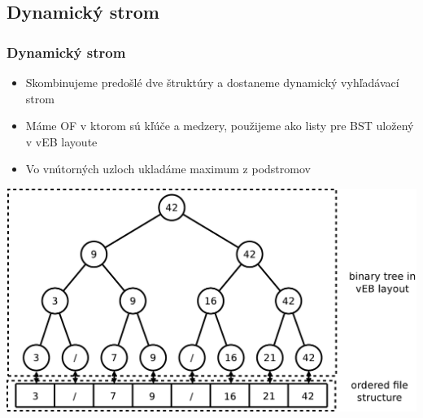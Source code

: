 \documentclass{beamer}
\begin{document}
\subsection{Dynamický strom}
\begin{frame}
    \frametitle{Dynamický strom}
    \begin{itemize}
        \item Skombinujeme predošlé dve štruktúry a dostaneme dynamický vyhľadávací strom
        \item Máme OF v ktorom sú kľúče a medzery, použijeme ako listy pre BST uložený v vEB layoute
        \item Vo vnútorných uzloch ukladáme maximum z podstromov
    \end{itemize}
    \begin{center}
        \includegraphics[height=0.5\textheight]{../figures/downloaded_dont_use/vEBpOFM.pdf}
    \end{center}
\end{frame}
\end{document}
